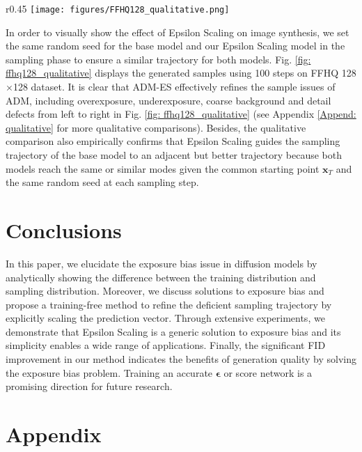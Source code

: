\documentclass{article} \usepackage{iclr2024_conference,times}
\begin{document}
\begin{wrapfigure}{r}{0.45\textwidth}
\vskip -0.2in
  \texttt{[image: figures/FFHQ128\_qualitative.png]}
  \captionsetup{skip=1pt}
  \caption{Qualitative comparison between ADM (first row) and ADM-ES (second row).}
\label{fig: ffhq128_qualitative}
\vskip -0.1in
\end{wrapfigure}

In order to visually show the effect of Epsilon Scaling on image synthesis, we set the same random seed for the base model and our Epsilon Scaling model in the sampling phase to ensure a similar trajectory for both models. Fig. \ref{fig: ffhq128_qualitative} displays the generated samples using 100 steps on FFHQ 128$\times$128 dataset. It is clear that ADM-ES effectively refines the sample issues of ADM, including overexposure, underexposure, coarse background and detail defects from left to right in Fig. \ref{fig: ffhq128_qualitative} (see Appendix \ref{Append: qualitative} for more qualitative comparisons). Besides, the qualitative comparison also empirically confirms that Epsilon Scaling guides the sampling trajectory of the base model to an adjacent but better trajectory because both models reach the same or similar modes given the common starting point $\pmb{x}_{T}$ and the same random seed at each sampling step.


\section{Conclusions}
In this paper, we elucidate the exposure bias issue in diffusion models by analytically showing the difference between the training distribution and sampling distribution. Moreover, we discuss solutions to exposure bias and propose a training-free method to refine the deficient sampling trajectory by explicitly scaling the prediction vector. Through extensive experiments, we demonstrate that Epsilon Scaling is a generic solution to exposure bias and its simplicity enables a wide range of applications. Finally, the significant FID improvement in our method indicates the benefits of generation quality by solving the exposure bias problem. Training an accurate $\pmb{\epsilon}$ or score network is a promising direction for future research.










\newpage
\appendix
\section{Appendix}
\end{document}
